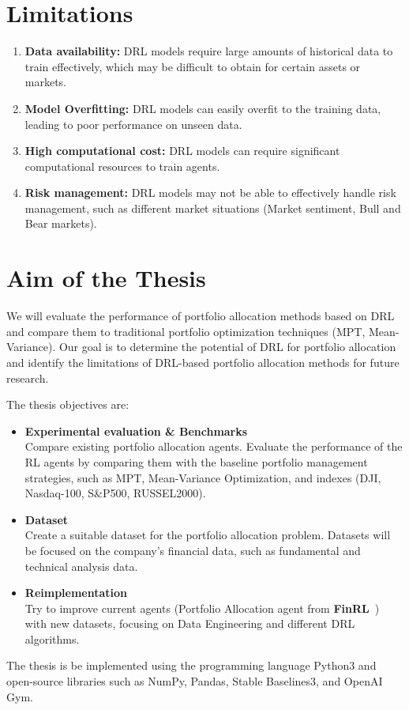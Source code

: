 \documentclass[../xlapes02]{subfiles}
\begin{document}
    \section{Limitations}\label{sec:limitations}

    \begin{enumerate}
        \item \textbf{Data availability:} DRL models require large amounts of historical data to train effectively, which may be difficult to obtain for certain assets or markets.
        \item \textbf{Model Overfitting:} DRL models can easily overfit to the training data, leading to poor performance on unseen data.
        \item \textbf{High computational cost:} DRL models can require significant computational resources to train agents.
        \item \textbf{Risk management:} DRL models may not be able to effectively handle risk management, such as different market situations (Market sentiment, Bull and Bear markets).
    \end{enumerate}


    \section{Aim of the Thesis}\label{sec:aim-of-the-thesis}
    We will evaluate the performance of portfolio allocation methods based on DRL and compare them to traditional portfolio optimization techniques (MPT, Mean-Variance). Our goal is to determine the potential of DRL for portfolio allocation and identify the limitations of DRL-based portfolio allocation methods for future research.

    The thesis objectives are:
    \begin{itemize}
        \item \textbf{Experimental evaluation \& Benchmarks}\\ Compare existing portfolio allocation agents. Evaluate the performance of the RL agents by comparing them with the baseline portfolio management strategies, such as MPT, Mean-Variance Optimization, and indexes (DJI, Nasdaq-100, S\&P500, RUSSEL2000).
        \item \textbf{Dataset}\\ Create a suitable dataset for the portfolio allocation problem. Datasets will be focused on the company's financial data, such as fundamental and technical analysis data.
        \item \textbf{Reimplementation}\\ Try to improve current agents (Portfolio Allocation agent from \textbf{FinRL}~\cite{finrl-portfolio-allocation-2020}) with new datasets, focusing on Data Engineering and different DRL algorithms.
    \end{itemize}

    The thesis is be implemented using the programming language Python3 and open-source libraries such as NumPy, Pandas, Stable Baselines3, and OpenAI Gym.
\end{document}
